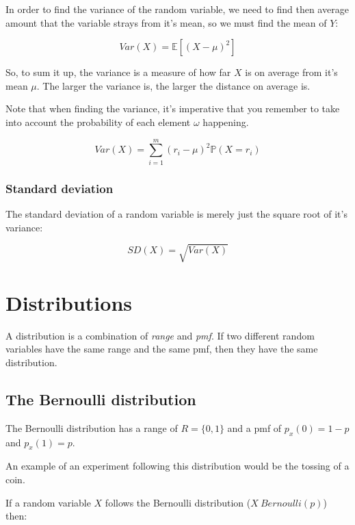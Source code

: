 In order to find the variance of the random variable, we need to find then
average amount that the variable strays from it's mean, so we must find the
mean of $Y$:

\begin{dmath}
	Var(X) = \mathbb{E}[(X - \mu)^2]
\end{dmath}

So, to sum it up, the variance is a measure of how far $X$ is on average from
it's mean $\mu$. The larger the variance is, the larger the distance on
average is.

Note that when finding the variance, it's imperative that you remember to take
into account the probability of each element $\omega$ happening.

\begin{dmath}
	{Var(X) = \sum\limits_{i=1}^{m}(r_i - \mu)^2\mathbb{P}(X=r_i)}
\end{dmath}

\subsubsection{Standard deviation}

The standard deviation of a random variable is merely just the square root of
it's variance:

\begin{dmath}
	SD(X) = \sqrt{Var(X)}
\end{dmath}

\section{Distributions}

A distribution is a combination of {\it range} and {\it pmf}. If two different
random variables have the same range and the same pmf, then they have the same
distribution.

\subsection{The Bernoulli distribution}

The Bernoulli distribution has a range of $R = \{0, 1\}$ and a pmf of $p_x(0) =
1-p$ and $p_x(1) = p$.

An example of an experiment following this distribution would be the tossing of
a coin.

If a random variable $X$ follows the Bernoulli distribution ($X ~ Bernoulli(p)$)
then:

